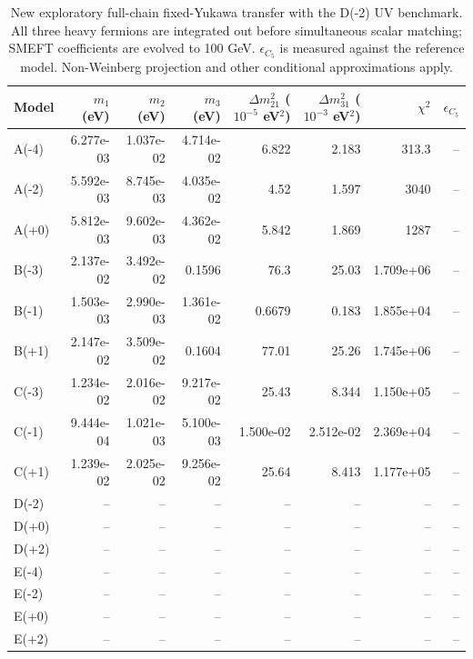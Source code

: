 \begin{table}[htbp]
\centering
\small
\setlength{\tabcolsep}{3.4pt}
\begin{tabular}{lrrrrrrr}
\hline
Model & $m_1$ (eV) & $m_2$ (eV) & $m_3$ (eV) & $\Delta m^2_{21}$ ($10^{-5}$ eV$^2$) & $\Delta m^2_{31}$ ($10^{-3}$ eV$^2$) & $\chi^2$ & $\epsilon_{C_5}$ \\
\hline
A(-4) & 6.277e-03 & 1.037e-02 & 4.714e-02 & 6.822 & 2.183 & 313.3 & -- \\
A(-2) & 5.592e-03 & 8.745e-03 & 4.035e-02 & 4.52 & 1.597 & 3040 & -- \\
A(+0) & 5.812e-03 & 9.602e-03 & 4.362e-02 & 5.842 & 1.869 & 1287 & -- \\
B(-3) & 2.137e-02 & 3.492e-02 & 0.1596 & 76.3 & 25.03 & 1.709e+06 & -- \\
B(-1) & 1.503e-03 & 2.990e-03 & 1.361e-02 & 0.6679 & 0.183 & 1.855e+04 & -- \\
B(+1) & 2.147e-02 & 3.509e-02 & 0.1604 & 77.01 & 25.26 & 1.745e+06 & -- \\
C(-3) & 1.234e-02 & 2.016e-02 & 9.217e-02 & 25.43 & 8.344 & 1.150e+05 & -- \\
C(-1) & 9.444e-04 & 1.021e-03 & 5.100e-03 & 1.500e-02 & 2.512e-02 & 2.369e+04 & -- \\
C(+1) & 1.239e-02 & 2.025e-02 & 9.256e-02 & 25.64 & 8.413 & 1.177e+05 & -- \\
D(-2) & -- & -- & -- & -- & -- & -- & -- \\
D(+0) & -- & -- & -- & -- & -- & -- & -- \\
D(+2) & -- & -- & -- & -- & -- & -- & -- \\
E(-4) & -- & -- & -- & -- & -- & -- & -- \\
E(-2) & -- & -- & -- & -- & -- & -- & -- \\
E(+0) & -- & -- & -- & -- & -- & -- & -- \\
E(+2) & -- & -- & -- & -- & -- & -- & -- \\
\hline
\end{tabular}
\caption{New exploratory full-chain fixed-Yukawa transfer with the D(-2) UV benchmark. All three heavy fermions are integrated out before simultaneous scalar matching; SMEFT coefficients are evolved to 100 GeV. $\epsilon_{C_5}$ is measured against the reference model. Non-Weinberg projection and other conditional approximations apply.}
\label{tab:generalised_b1}
\end{table}
